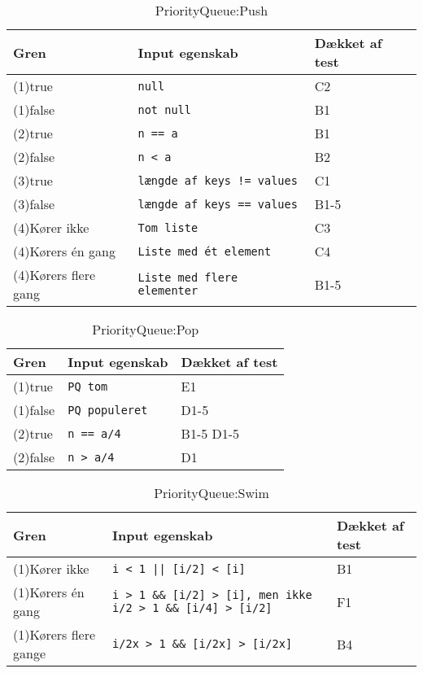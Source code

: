 
\begin{table}[!h]
	\caption{PriorityQueue:Push}
	\centering
	\begin{tabular}{L L L}
		\hline\hline
		Gren & Input egenskab & Dækket af test\\ [0.5ex]
		\hline
		(1)true & \verb?null? & C2\\
		(1)false & \verb?not null? & B1\\
		(2)true & \verb?n == a? & B1\\
		(2)false & \verb?n < a? & B2\\
		(3)true & \verb?længde af keys != values? & C1\\
		(3)false & \verb?længde af keys == values? & B1-5\\
		(4)Kører ikke & \verb?Tom liste? & C3\\
		(4)Kørers én gang & \verb?Liste med ét element? & C4\\
		(4)Kørers flere gang & \verb?Liste med flere elementer? & B1-5\\
		\hline
	\end{tabular}
\end{table}

\begin{table}[!h]
	\caption{PriorityQueue:Pop}
	\centering
	\begin{tabular}{L L L}
		\hline\hline
		Gren & Input egenskab & Dækket af test\\ [0.5ex]
		\hline
		(1)true & \verb?PQ tom? & E1\\
		(1)false & \verb?PQ populeret? & D1-5\\
		(2)true & \verb?n == a/4? & B1-5 D1-5\\
		(2)false & \verb?n > a/4? & D1\\
		\hline
	\end{tabular}
\end{table}

\begin{table}[!h]
	\caption{PriorityQueue:Swim}
	\centering
	\begin{tabular}{L L L}
		\hline\hline
		Gren & Input egenskab & Dækket af test\\ [0.5ex]
		\hline
		(1)Kører ikke & \verb?i < 1 || [i/2] < [i]? & B1\\
		(1)Kørers én gang & \verb?i > 1 && [i/2] > [i], men ikke i/2 > 1 && [i/4] > [i/2]? & F1\\
		(1)Kørers flere gange & \verb?i/2x > 1 && [i/2x] > [i/2x]? & B4\\
		\hline
	\end{tabular}
\end{table}

